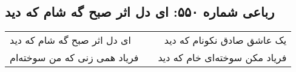 \begin{center}
\section*{رباعی شماره ۵۵۰: ای دل اثر صبح گه شام که دید}
\label{sec:0550}
\begin{longtable}{l p{0.5cm} r}
ای دل اثر صبح گه شام که دید
&&
یک عاشق صادق نکونام که دید
\\
فریاد همی زنی که من سوخته‌ام
&&
فریاد مکن سوخته‌ای خام که دید
\\
\end{longtable}
\end{center}

